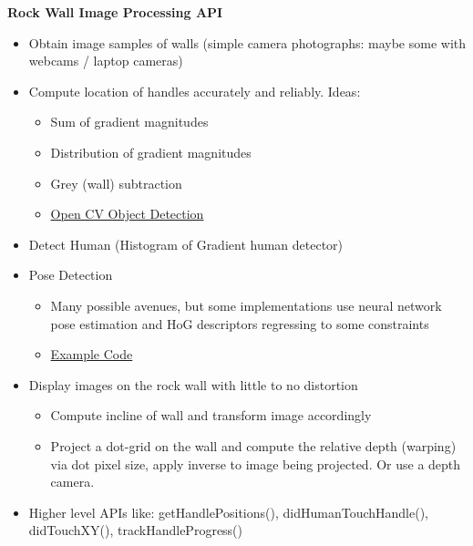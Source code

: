 \documentclass[12pt]{article}
\begin{document}
\textbf{Rock Wall Image Processing API}
\begin{itemize}[noitemsep]
    \item Obtain image samples of walls (simple camera photographs: maybe some with webcams / laptop cameras)
    \item Compute location of handles accurately and reliably. Ideas:
    \begin{itemize}[noitemsep]
        \item Sum of gradient magnitudes
        \item Distribution of gradient magnitudes
        \item Grey (wall) subtraction
        \item \href{http://docs.opencv.org/2.4/modules/objdetect/doc/objdetect.html}{Open CV Object Detection}
    \end{itemize}
    \item Detect Human (Histogram of Gradient human detector)
    \item Pose Detection
    \begin{itemize}[noitemsep]
        \item Many possible avenues, but some implementations use neural network pose estimation and HoG descriptors regressing to some constraints
        \item \href{http://groups.inf.ed.ac.uk/calvin/articulated_human_pose_estimation_code/}{Example Code}
    \end{itemize}
    \item Display images on the rock wall with little to no distortion
    \begin{itemize}[noitemsep]
        \item Compute incline of wall and transform image accordingly
        \item Project a dot-grid on the wall and compute the relative depth (warping) via dot pixel size, apply inverse to image being projected. Or use a depth camera.
    \end{itemize}
    \item Higher level APIs like: getHandlePositions(), didHumanTouchHandle(), didTouchXY(), trackHandleProgress()
\end{itemize}
\end{document}
